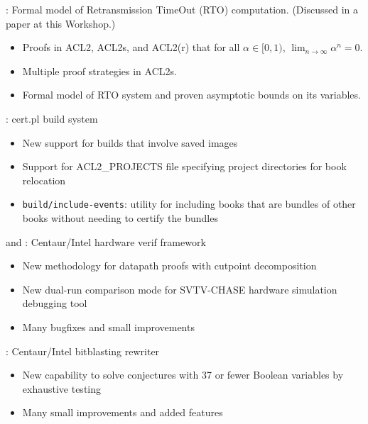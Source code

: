 
\begin{frame}

\newlibtitle

:
Formal model of Retransmission TimeOut (RTO) computation.
(Discussed in a paper at this Workshop.)
\begin{itemize}
\item Proofs in ACL2, ACL2s, and ACL2(r) that for all $\alpha \in [0, 1)$,
      $\lim_{n\to\infty}\alpha^n = 0$.
\item Multiple proof strategies in ACL2s.
\item Formal model of RTO system and proven asymptotic bounds on its variables.
\end{itemize}

\end{frame}


\begin{frame}

\implibtitle

:
cert.pl build system
\begin{itemize}
\item New support for builds that involve saved images
\item Support for ACL2\_PROJECTS file specifying project directories for book relocation
\item \texttt{build/include-events}: utility for including books that
  are bundles of other books without needing to certify the bundles
\end{itemize}

\end{frame}


\begin{frame}

\implibtitle

 and :
Centaur/Intel hardware verif framework
\begin{itemize}
\item New methodology for datapath proofs with cutpoint decomposition
\item New dual-run comparison mode for SVTV-CHASE hardware simulation debugging tool
\item Many bugfixes and small improvements
\end{itemize}

:
Centaur/Intel bitblasting rewriter
\begin{itemize}
\item New capability to solve conjectures with 37 or fewer Boolean variables by exhaustive testing
\item Many small improvements and added features
\end{itemize}

\end{frame}

